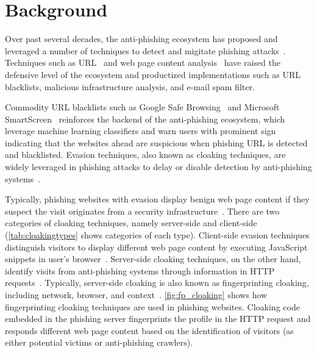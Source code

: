 \section{Background}
\label{s:background}

\cloakingTypes



Over past several decades, the anti-phishing ecosystem has proposed and leveraged a number of techniques to detect and migitate phishing attacks~\cite{oest2018inside}.
Techniques such as URL~\cite{bin2010dns, blum2010lexical, huang2012svm, khonji2011novel} and web page content analysis~\cite{wu2006web, zhang2007cantina, zhang2011textual, bilge2011exposure, canali2013role} have raised the defensive level of the ecosystem and productized implementations such as URL blacklists, malicious infrastructure analysis, and e-mail spam filter.

Commodity URL blacklists such as Google Safe Browsing~\cite{whittaker2010large} and Microsoft SmartScreen~\cite{smartscreen} reinforces the backend of the anti-phishing ecosystem, which leverage machine learning classifiers and warn users with prominent sign indicating that the websites ahead are suspicious when phishing URL is detected and blacklisted.
Evasion techniques, also known as cloaking techniques, are widely leveraged in phishing attacks to delay or disable detection by anti-phishing systems~\cite{liang2016cracking, oest2019phishfarm, oest2020phishtime}.



Typically, phishing websites with evasion display benign web page content if they suspect the visit originates from a security infrastructure~\cite{wu2005cloaking}.
There are two categories of cloaking techniques, namely server-side and client-side (\autoref{tab:cloakingtypes} shows categories of each type).
Client-side evasion techniques distinguish visitors to display different web page content by executing JavaScript snippets in user's browser~\cite{zhang2021crawlphish}.
Server-side cloaking techniques, on the other hand, identify visits from anti-phishing systems through information in HTTP requests~\cite{oest2018inside, invernizzi2016cloak}.
Typically, server-side cloaking is also known as fingerprinting cloaking, including network, browser, and context~\cite{invernizzi2016cloak}.
\autoref{fig:fp_cloaking} shows how fingerprinting cloaking techniques are used in phishing websites.
Cloaking code embedded in the phishing server fingerprints the profile in the HTTP request and responds different web page content based on the identification of visitors (as either potential victims or anti-phishing crawlers).

